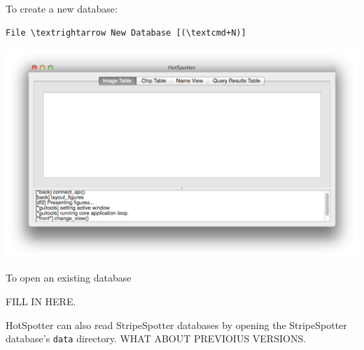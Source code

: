 \documentclass[a4paper,10pt]{article}
\begin{document}
    \renewcommand{\textrightarrow}{$\rightarrow$}
    \newcommand{\textcmd}{\cmdkey}

    To create a new database: \\
    \begin{Verbatim}[commandchars=\\\{\}]
    File \textrightarrow New Database [(\textcmd+N)]
    \end{Verbatim}

    \begin{center}
        \includegraphics[scale=0.15]{images/start.png}
    \end{center}

    To open an existing database

    FILL IN HERE.


    HotSpotter can also read StripeSpotter databases by opening the
    StripeSpotter database's {\tt data} directory.  WHAT ABOUT
    PREVIOIUS VERSIONS.
    
\end{document}
